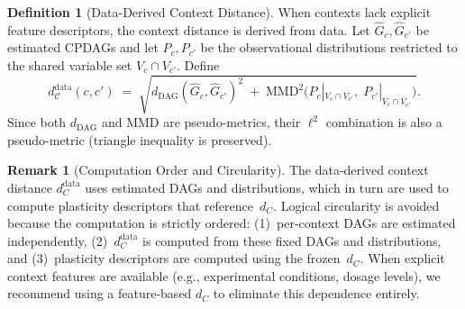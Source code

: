 \documentclass[11pt,a4paper]{article}
\theoremstyle{definition}
\newtheorem{definition}[theorem]{Definition}
\newtheorem{remark}[theorem]{Remark}
\newcommand{\cC}{\mathcal{C}}                 %
\newcommand{\MMD}{\mathrm{MMD}}               %
\newcommand{\dDAG}{d_{\mathrm{DAG}}}          %
\newcommand{\dC}{d_{\cC}}                     %
\begin{document}
\begin{definition}[Data-Derived Context Distance]\label{def:data-context-distance}
When contexts lack explicit feature descriptors, the context distance is
derived from data.  Let $\hat{G}_c, \hat{G}_{c'}$ be estimated CPDAGs and
let $P_c, P_{c'}$ be the observational distributions restricted to the
shared variable set $V_c \cap V_{c'}$.  Define
\[
  \dC^{\mathrm{data}}(c, c')
  \;=\;
  \sqrt{
    \dDAG(\hat{G}_c, \hat{G}_{c'})^2
    \;+\;
    \MMD^2\!\bigl(P_c|_{V_c \cap V_{c'}},\;
                   P_{c'}|_{V_c \cap V_{c'}}\bigr)
  }.
\]
Since both $\dDAG$ and $\MMD$ are pseudo-metrics, their $\ell^2$
combination is also a pseudo-metric (triangle inequality is preserved).
\end{definition}

\begin{remark}[Computation Order and Circularity]
The data-derived context distance $d_C^{\mathrm{data}}$ uses estimated
DAGs and distributions, which in turn are used to compute plasticity
descriptors that reference~$d_C$.  Logical circularity is avoided
because the computation is strictly ordered: (1)~per-context DAGs are
estimated independently, (2)~$d_C^{\mathrm{data}}$ is computed from
these fixed DAGs and distributions, and (3)~plasticity descriptors are
computed using the frozen~$d_C$.  When explicit context features are
available (e.g., experimental conditions, dosage levels), we recommend
using a feature-based $d_C$ to eliminate this dependence entirely.
\end{remark}
\end{document}
